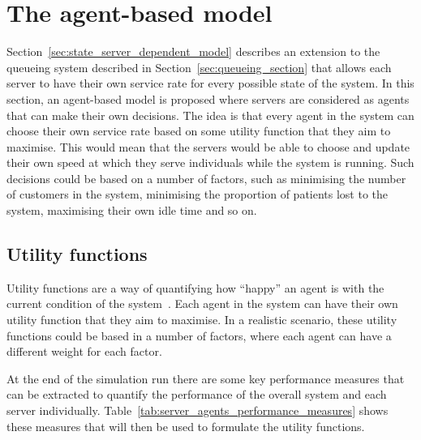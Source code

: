 \section{The agent-based model}\label{sec:agent_based_model}

Section~\ref{sec:state_server_dependent_model} describes an extension to the
queueing system described in Section~\ref{sec:queueing_section} that allows
each server to have their own service rate for every possible state of the
system.
In this section, an agent-based model is proposed where servers are considered
as agents that can make their own decisions.
The idea is that every agent in the system can choose their own service rate
based on some utility function that they aim to maximise.
This would mean that the servers would be able to choose and update their own
speed at which they serve individuals while the system is running.
Such decisions could be based on a number of factors, such as minimising the
number of customers in the system, minimising the proportion of patients lost
to the system, maximising their own idle time and so on.

\subsection{Utility functions}

Utility functions are a way of quantifying how ``happy'' an agent is with the
current condition of the system~\cite{fishburn1970utility, fishburn1968utility}.
Each agent in the system can have their own utility function that they aim to
maximise.
In a realistic scenario, these utility functions could be based in a number of
factors, where each agent can have a different weight for each factor.

At the end of the simulation run there are some key performance measures that
can be extracted to quantify the performance of the overall system and each
server individually.
Table~\ref{tab:server_agents_performance_measures} shows these measures that
will then be used to formulate the utility functions.

